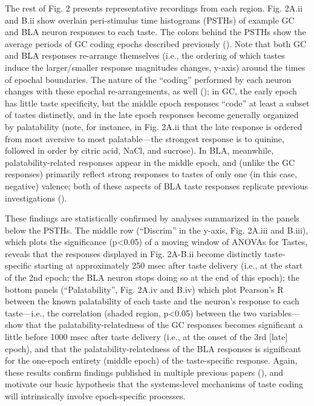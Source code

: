 \begin{refsection}
The rest of Fig. 2 presents representative recordings from each region. Fig. 2A.ii and B.ii show overlain peri-stimulus time histograms (PSTHs) of example GC and BLA neuron responses to each taste. The colors behind the PSTHs show the average periods of GC coding epochs described previously (\cite{katz2001a,fontanini2009a,sadacca2012a}). Note that both GC and BLA responses re-arrange themselves (i.e., the ordering of which tastes induce the larger/smaller response magnitudes changes, y-axis) around the times of epochal boundaries. The nature of the “coding” performed by each neuron changes with these epochal re-arrangements, as well (\cite{katz2001a,sadacca2012a,moran2014a,li2016a}); in GC, the early epoch has little taste specificity, but the middle epoch responses “code” at least a subset of tastes distinctly, and in the late epoch responses become generally organized by palatability (note, for instance, in Fig. 2A.ii that the late response is ordered from most aversive to most palatable—the strongest response is to quinine, followed in order by citric acid, NaCl, and sucrose). In BLA, meanwhile, palatability-related responses appear in the middle epoch, and (unlike the GC responses) primarily reflect strong responses to tastes of only one (in this case, negative) valence; both of these aspects of BLA taste responses replicate previous investigations (\cite{fontanini2009a}).

These findings are statistically confirmed by analyses summarized in the panels below the PSTHs. The middle row (“Discrim” in the y-axis, Fig. 2A.iii and B.iii), which plots the significance (p<0.05) of a moving window of ANOVAs for Tastes, reveals that the responses displayed in Fig. 2A-B.ii become distinctly taste-specific starting at approximately 250 msec after taste delivery (i.e., at the start of the 2nd epoch; the BLA neuron stops doing so at the end of this epoch); the bottom panels (“Palatability”, Fig. 2A.iv and B.iv) which plot Pearson’s R between the known palatability of each taste and the neuron’s response to each taste—i.e., the correlation (shaded region, p<0.05) between the two variables—show that the palatability-relatedness of the GC responses becomes significant a little before 1000 msec after taste delivery (i.e., at the onset of the 3rd [late] epoch), and that the palatability-relatedness of the BLA responses is significant for the one-epoch  entirety (middle epoch) of the taste-specific response. Again, these results confirm findings published in multiple previous papers (\cite{katz2001a,grossman2008a,fontanini2009a,sadacca2012a}), and motivate our basic hypothesis that the systems-level mechanisms of taste coding will intrinsically involve epoch-specific processes.


\end{refsection}
